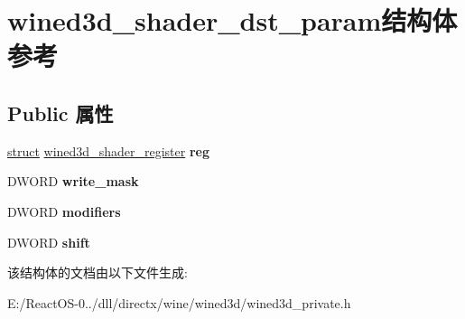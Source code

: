 \hypertarget{structwined3d__shader__dst__param}{}\section{wined3d\+\_\+shader\+\_\+dst\+\_\+param结构体 参考}
\label{structwined3d__shader__dst__param}
\subsection*{Public 属性}
\begin{DoxyCompactItemize}
\item 
\mbox{\label{structwined3d__shader__dst__param_a48061ac4151f63bd8fc89553b468c830}} 
\hyperlink{interfacestruct}{struct} \hyperlink{structwined3d__shader__register}{wined3d\+\_\+shader\+\_\+register} {\bfseries reg}
\item 
\mbox{\label{structwined3d__shader__dst__param_a1bc9c2c57cb811f5659531c803ccc8f8}} 
D\+W\+O\+RD {\bfseries write\+\_\+mask}
\item 
\mbox{\label{structwined3d__shader__dst__param_a6ddc657e5110ff207f22dce5f34c6d61}} 
D\+W\+O\+RD {\bfseries modifiers}
\item 
\mbox{\label{structwined3d__shader__dst__param_a2fe931db32c2f5d3831270e6e1ace9fb}} 
D\+W\+O\+RD {\bfseries shift}
\end{DoxyCompactItemize}


该结构体的文档由以下文件生成\+:\begin{DoxyCompactItemize}
\item 
E\+:/\+React\+O\+S-\/0../dll/directx/wine/wined3d/wined3d\+\_\+private.\+h\end{DoxyCompactItemize}
